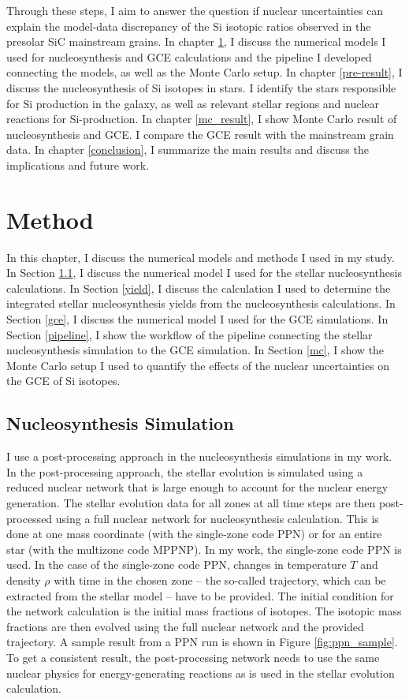 \documentclass{brandeis-thesis3.2}
\begin{document}
Through these steps, I aim to answer the question if nuclear uncertainties can explain the model-data discrepancy of the Si isotopic ratios observed in the presolar SiC mainstream grains. In chapter \ref{method}, I discuss the numerical models I used for nucleosynthesis and GCE calculations and the pipeline I developed connecting the models, as well as the Monte Carlo setup. In chapter \ref{pre-result}, I discuss the nucleosynthesis of Si isotopes in stars. I identify the stars responsible for Si production in the galaxy, as well as relevant stellar regions and nuclear reactions for Si-production. In chapter \ref{mc_result}, I show Monte Carlo result of nucleosynthesis and GCE. I compare the GCE result with the mainstream grain data. In chapter \ref{conclusion}, I summarize the main results and discuss the implications and future work.



\chapter{Method} \label{method}

In this chapter, I discuss the numerical models and methods I used in my study. In Section \ref{nucleosynthesis}, I discuss the numerical model I used for the stellar nucleosynthesis calculations. In Section \ref{yield}, I discuss the calculation I used to determine the integrated stellar nucleosynthesis yields from the nucleosynthesis calculations. In Section \ref{gce}, I discuss the numerical model I used for the GCE simulations. In Section \ref{pipeline}, I show the workflow of the pipeline connecting the stellar nucleosynthesis simulation to the GCE simulation. In Section \ref{mc}, I show the Monte Carlo setup I used to quantify the effects of the nuclear uncertainties on the GCE of Si isotopes.

\section{Nucleosynthesis Simulation} \label{nucleosynthesis}
I use a post-processing approach in the nucleosynthesis simulations in my work. In the post-processing approach, the stellar evolution is simulated using a reduced nuclear network that is large enough to account for the nuclear energy generation. The stellar evolution data for all zones at all time steps are then post-processed using a full nuclear network for nucleosynthesis calculation. This is done at one mass coordinate (with the single-zone code PPN) or for an entire star (with the multizone code MPPNP). In my work, the single-zone code PPN is used. In the case of the single-zone code PPN, changes in temperature $T$ and density $\rho$ with time in the chosen zone -- the so-called trajectory, which can be extracted from the stellar model -- have to be provided. The initial condition for the network calculation is the initial mass fractions of isotopes. The isotopic mass fractions are then evolved using the full nuclear network and the provided trajectory. A sample result from a PPN run is shown in Figure \ref{fig:ppn_sample}. To get a consistent result, the post-processing network needs to use the same nuclear physics for energy-generating reactions as is used in the stellar evolution calculation.
\end{document}
